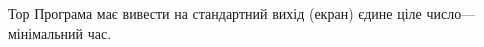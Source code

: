 \begin{problemAllDefault}{Тор}
\OutputFile Програма має вивести на стандартний вихід (екран) єдине ціле число\nolinebreak[3] --- мінімальний час.

\Examples
\hspace{-1.5em}
\begin{exampleSimple}{6.75em}{3em}%
%
\end{exampleSimple}
\hspace{-1.5em}
\begin{exampleSimple}{6.75em}{3em}%
%
\end{exampleSimple}
\hspace*{-0.5em}


\end{problemAllDefault}